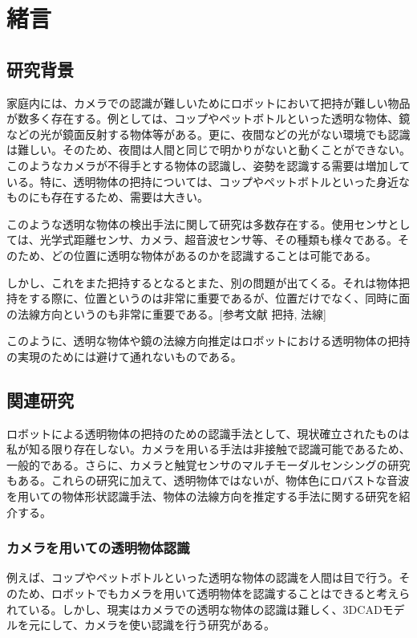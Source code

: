 \section{緒言}
\label{chap:introduction}

\subsection{研究背景}
\label{sec:back_ground}
家庭内には、カメラでの認識が難しいためにロボットにおいて把持が難しい物品が数多く存在する。例としては、コップやペットボトルといった透明な物体、鏡などの光が鏡面反射する物体等がある。更に、夜間などの光がない環境でも認識は難しい。そのため、夜間は人間と同じで明かりがないと動くことができない。このようなカメラが不得手とする物体の認識し、姿勢を認識する需要は増加している。特に、透明物体の把持については、コップやペットボトルといった身近なものにも存在するため、需要は大きい。

このような透明な物体の検出手法に関して研究は多数存在する。使用センサとしては、光学式距離センサ、カメラ、超音波センサ等、その種類も様々である。そのため、どの位置に透明な物体があるのかを認識することは可能である。

しかし、これをまた把持するとなるとまた、別の問題が出てくる。それは物体把持をする際に、位置というのは非常に重要であるが、位置だけでなく、同時に面の法線方向というのも非常に重要である。[参考文献 把持, 法線]

このように、透明な物体や鏡の法線方向推定はロボットにおける透明物体の把持の実現のためには避けて通れないものである。

\subsection{関連研究}
\label{sec:related_works}
ロボットによる透明物体の把持のための認識手法として、現状確立されたものは私が知る限り存在しない。カメラを用いる手法は非接触で認識可能であるため、一般的である。さらに、カメラと触覚センサのマルチモーダルセンシングの研究もある。これらの研究に加えて、透明物体ではないが、物体色にロバストな音波を用いての物体形状認識手法、物体の法線方向を推定する手法に関する研究を紹介する。

\subsubsection{カメラを用いての透明物体認識}
\label{sec:robot_pouring_human_skill}
例えば、コップやペットボトルといった透明な物体の認識を人間は目で行う。そのため、ロボットでもカメラを用いて透明物体を認識することはできると考えられている。しかし、現実はカメラでの透明な物体の認識は難しく、3DCADモデルを元にして、カメラを使い認識を行う研究がある。

